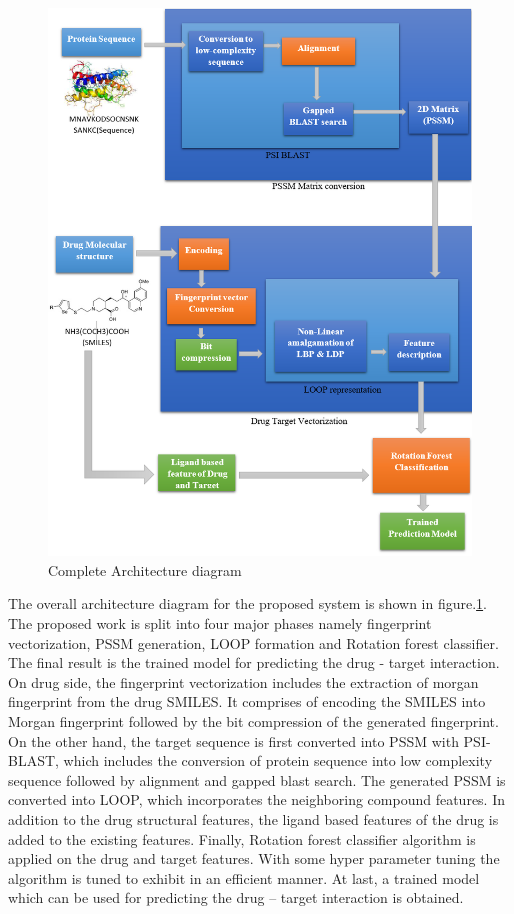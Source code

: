 \documentclass[conference]{IEEEtran}
\begin{document}
\begin{figure}[htbp]
\centerline{\includegraphics[scale=0.34]{figures/fig1.png}}
\caption{Complete Architecture diagram}
\label{f1}
\end{figure}

The overall architecture diagram for the proposed system is shown in figure.\ref{f1}. The proposed work is split into four major phases namely fingerprint vectorization, PSSM generation, LOOP formation and Rotation forest classifier. The final result is the trained model for predicting the drug - target interaction. On drug side, the fingerprint vectorization includes the extraction of morgan fingerprint from the drug SMILES. It comprises of encoding the SMILES into Morgan fingerprint followed by the bit compression of the generated fingerprint. On the other hand, the target sequence is first converted into PSSM with PSI-BLAST, which includes the conversion of protein sequence into low complexity sequence followed by alignment and gapped blast search. The generated PSSM is converted into LOOP, which incorporates the neighboring compound features. In addition to the drug structural features, the ligand based features of the drug is added to the existing features. Finally, Rotation forest classifier algorithm is applied on the drug and target features. With some hyper parameter tuning the algorithm is tuned to exhibit in an efficient manner. At last, a trained model which can be used for predicting the drug – target interaction is obtained.
\end{document}

